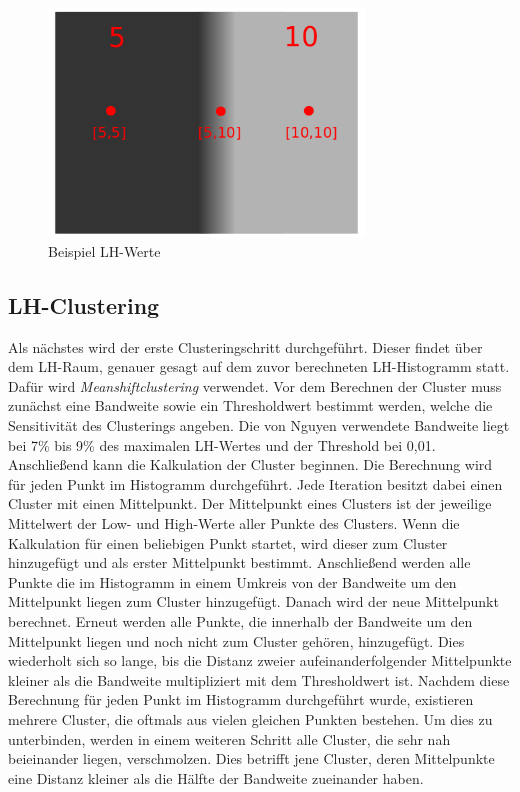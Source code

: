 \begin{figure}[!h] 
\centering 
\includegraphics[width=0.75\textwidth]{Logos/LH.PNG}
\caption{Beispiel LH-Werte} 
\label{fig:lh_bsp} 
\end{figure}



\subsection{LH-Clustering}

Als nächstes wird der erste Clusteringschritt durchgeführt. Dieser findet über dem LH-Raum, genauer gesagt auf dem zuvor berechneten LH-Histogramm statt. Dafür wird \textit{Meanshiftclustering} verwendet.
\newline
Vor dem Berechnen der Cluster muss zunächst eine Bandweite sowie ein Thresholdwert bestimmt werden, welche die Sensitivität des Clusterings angeben. Die von Nguyen \cite{nguyen2012clustering} verwendete Bandweite liegt bei 7\% bis 9\% des maximalen LH-Wertes und der Threshold bei 0,01. Anschließend kann die Kalkulation der Cluster beginnen.
\newline
Die Berechnung wird für jeden Punkt im Histogramm durchgeführt. Jede Iteration besitzt dabei einen Cluster mit einen Mittelpunkt. Der Mittelpunkt eines Clusters ist der jeweilige Mittelwert der Low- und High-Werte aller Punkte des Clusters. Wenn die Kalkulation für einen beliebigen Punkt startet, wird dieser zum Cluster hinzugefügt und als erster Mittelpunkt bestimmt. Anschließend werden alle Punkte die im Histogramm in einem Umkreis von der Bandweite um den Mittelpunkt liegen zum Cluster hinzugefügt. Danach wird der neue Mittelpunkt berechnet. Erneut werden alle Punkte, die innerhalb der Bandweite um den Mittelpunkt liegen und noch nicht zum Cluster gehören, hinzugefügt. Dies wiederholt sich so lange, bis die Distanz zweier aufeinanderfolgender Mittelpunkte kleiner als die Bandweite multipliziert mit dem Thresholdwert ist.
\newline
Nachdem diese Berechnung für jeden Punkt im Histogramm durchgeführt wurde, existieren mehrere Cluster, die oftmals aus vielen gleichen Punkten bestehen. Um dies zu unterbinden, werden in einem weiteren Schritt alle Cluster, die sehr nah beieinander liegen, verschmolzen. Dies betrifft jene Cluster, deren Mittelpunkte eine Distanz kleiner als die Hälfte der Bandweite zueinander haben.



